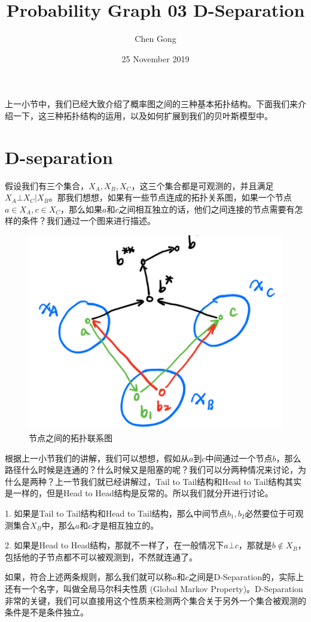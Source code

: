 \documentclass[a4paper]{article}
\title{Probability Graph 03 D-Separation}
\author{Chen Gong}
\date{25 November 2019}
\begin{document}
\maketitle
上一小节中，我们已经大致介绍了概率图之间的三种基本拓扑结构。下面我们来介绍一下，这三种拓扑结构的运用，以及如何扩展到我们的贝叶斯模型中。

\section{D-separation}
假设我们有三个集合，$X_A,X_B,X_C$，这三个集合都是可观测的，并且满足$X_A\bot X_C|X_B$。那我们想想，如果有一些节点连成的拓扑关系图，如果一个节点$a\in X_A,c\in X_C$，那么如果$a$和$c$之间相互独立的话，他们之间连接的节点需要有怎样的条件？我们通过一个图来进行描述。
\begin{figure}[H]
    \centering
    \includegraphics[width=.55\textwidth]{微信图片_20191125143139.png}
    \caption{节点之间的拓扑联系图}
    \label{fig:my_label_1}
\end{figure}

根据上一小节我们的讲解，我们可以想想，假如从$a$到$c$中间通过一个节点$b$，那么路径什么时候是连通的？什么时候又是阻塞的呢？我们可以分两种情况来讨论，为什么是两种？上一节我们就已经讲解过，Tail to Tail结构和Head to Tail结构其实是一样的，但是Head to Head结构是反常的。所以我们就分开进行讨论。

1. 如果是Tail to Tail结构和Head to Tail结构，那么中间节点$b_1,b_2$必然要位于可观测集合$X_B$中，那么$a$和$c$才是相互独立的。

2. 如果是Head to Head结构，那就不一样了，在一般情况下$a\bot c$，那就是$b\notin X_B$，包括他的子节点都不可以被观测到，不然就连通了。

如果，符合上述两条规则，那么我们就可以称$a$和$c$之间是D-Separation的，实际上还有一个名字，叫做全局马尔科夫性质 (Global Markov Property)。D-Separation非常的关键，我们可以直接用这个性质来检测两个集合关于另外一个集合被观测的条件是不是条件独立。
\end{document}
